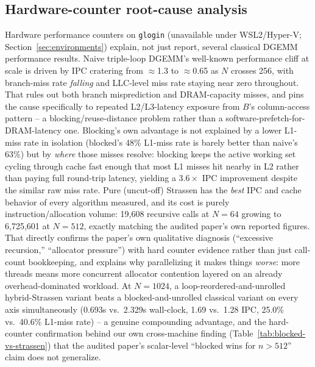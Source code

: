 \documentclass[acmsmall]{acmart}
\begin{document}
\subsection{Hardware-counter root-cause analysis}
Hardware performance counters on \texttt{glogin} (unavailable
under WSL2/Hyper-V; Section~\ref{sec:environments}) explain, not just
report, several classical DGEMM performance results. Naive triple-loop
DGEMM's well-known performance cliff at scale is driven by IPC cratering
from $\approx$1.3 to $\approx$0.65 as $N$ crosses 256, with branch-miss
rate \emph{falling} and LLC-level miss rate staying near zero throughout.
That rules out both branch misprediction and DRAM-capacity misses, and
pins the cause specifically to repeated L2/L3-latency exposure from
$B$'s column-access pattern -- a blocking/reuse-distance problem rather
than a software-prefetch-for-DRAM-latency one. Blocking's own advantage
is not explained by a lower L1-miss rate in isolation (blocked's 48\%
L1-miss rate is barely better than naive's 63\%) but by \emph{where}
those misses resolve: blocking keeps the active working set cycling
through cache fast enough that most L1 misses hit nearby in L2 rather
than paying full round-trip latency, yielding a $3.6\times$ IPC
improvement despite the similar raw miss rate. Pure (uncut-off)
Strassen has the \emph{best} IPC and cache behavior of every algorithm
measured, and its cost is purely instruction/allocation volume:
19{,}608 recursive calls at $N{=}64$ growing to 6{,}725{,}601 at
$N{=}512$, exactly matching the audited paper's own reported figures.
That directly confirms the paper's own qualitative diagnosis
(``excessive recursion,'' ``allocator pressure'') with hard counter
evidence rather than just call-count bookkeeping, and explains why
parallelizing it makes things \emph{worse}: more threads means more
concurrent allocator contention layered on an already overhead-dominated
workload. At
$N{=}1024$, a loop-reordered-and-unrolled hybrid-Strassen variant beats
a blocked-and-unrolled classical variant on every axis simultaneously
(0.693s vs.\ 2.329s wall-clock, 1.69 vs.\ 1.28 IPC, 25.0\% vs.\ 40.6\%
L1-miss rate) -- a genuine compounding advantage, and the hard-counter
confirmation behind our own cross-machine finding
(Table~\ref{tab:blocked-vs-strassen}) that the audited paper's
scalar-level ``blocked wins for $n{>}512$'' claim does not generalize.
\end{document}

